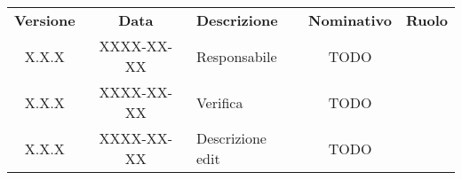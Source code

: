 {
    \renewcommand{\arraystretch}{1.5}
    \centering
    \begin{longtable}{ c c  C{4cm}  c  c }
        \rowcolor{\primaryColor}
        \textcolor{\secondaryColor}{
        \textbf{Versione}}     & \textcolor{\secondaryColor}{\textbf{Data}}       & \textcolor{\secondaryColor}
        {\textbf{Descrizione}} & \textcolor{\secondaryColor}{\textbf{Nominativo}} & \textcolor{\secondaryColor}{\textbf{Ruolo}}                          \\


        X.X.X                  & XXXX-XX-XX                                       & Responsabile                                & TODO & \responsabile{} \\
        X.X.X                  & XXXX-XX-XX                                       & Verifica                                    & TODO & \verificatore{} \\
        X.X.X                  & XXXX-XX-XX                                       & Descrizione edit                            & TODO & \redattore{}    \\
    \end{longtable}
}